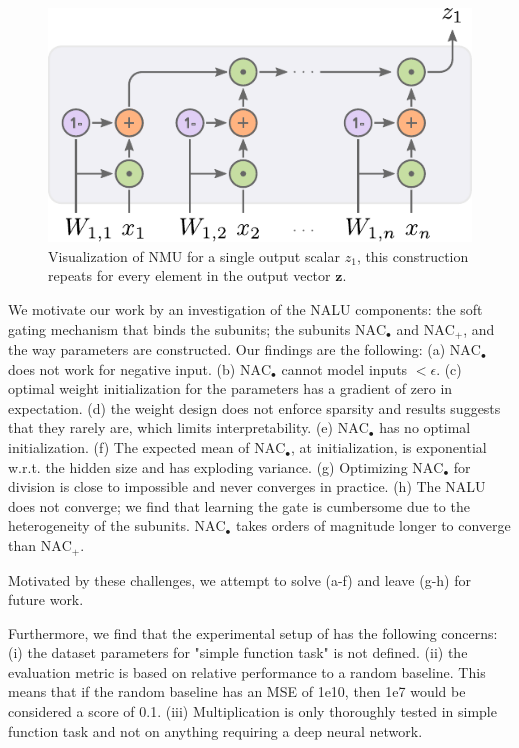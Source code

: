 \begin{figure}[h]
\centering
\includegraphics[scale=0.6]{graphics/nmu.pdf}
\caption{Visualization of NMU for a single output scalar $z_1$, this construction repeats for every element in the output vector $\mathbf{z}$.}
\end{figure}
We motivate our work by an investigation of the NALU components: the soft gating mechanism that binds the subunits; the subunits $\text{NAC}_{\bullet}$ and $\text{NAC}_{+}$, and the way parameters are constructed.
Our findings are the following:
(a) $\text{NAC}_{\bullet}$ does not work for negative input.
(b) $\text{NAC}_{\bullet}$ cannot model inputs $<\epsilon$.
(c) optimal weight initialization for the parameters has a gradient of zero in expectation.
(d) the weight design does not enforce sparsity and results suggests that they rarely are, which limits interpretability.
(e) $\text{NAC}_{\bullet}$ has no optimal initialization.
(f) The expected mean of $\text{NAC}_{\bullet}$, at initialization, is exponential w.r.t. the hidden size and has exploding variance.
(g) Optimizing $\text{NAC}_{\bullet}$ for division is close to impossible and never converges in practice.
(h) The NALU does not converge; we find that learning the gate is cumbersome due to the heterogeneity of the subunits. $\text{NAC}_{\bullet}$ takes orders of magnitude longer to converge than $\text{NAC}_{+}$.%

Motivated by these challenges, we attempt to solve (a-f) and leave (g-h) for future work.

Furthermore, we find that the experimental setup of \citet{trask-nalu} has the following concerns: (i) the dataset parameters for "simple function task" is not defined. (ii) the evaluation metric is based on relative performance to a random baseline. This means that if the random baseline has an MSE of 1e10, then 1e7 would be considered a score of 0.1. (iii) Multiplication is only thoroughly tested in simple function task and not on anything requiring a deep neural network.


